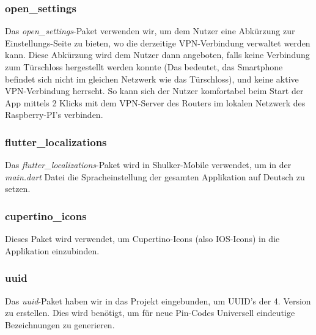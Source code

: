 \subsubsection{open\_settings}
Das \textit{open\_settings}-Paket verwenden wir, um dem Nutzer eine Abkürzung zur Einstellungs-Seite zu bieten, 
wo die derzeitige VPN-Verbindung verwaltet werden kann. Diese Abkürzung wird dem Nutzer dann angeboten, falls 
keine Verbindung zum Türschloss hergestellt werden konnte (Das bedeutet, das Smartphone befindet sich nicht im gleichen
Netzwerk wie das Türschloss), und keine aktive VPN-Verbindung herrscht. So kann sich der Nutzer komfortabel beim Start
der App mittels 2 Klicks mit dem VPN-Server des Routers im lokalen Netzwerk des Raspberry-PI's verbinden. 

\subsubsection{flutter\_localizations}
Das \textit{flutter\_localizations}-Paket wird in Shulker-Mobile verwendet, um in der \textit{main.dart} Datei
die Spracheinstellung der gesamten Applikation auf Deutsch zu setzen.

\subsubsection{cupertino\_icons}
Dieses Paket wird verwendet, um Cupertino-Icons (also IOS-Icons) in die Applikation einzubinden.

\subsubsection{uuid}
Das \textit{uuid}-Paket haben wir in das Projekt eingebunden, um UUID's der 4. Version zu erstellen.
Dies wird benötigt, um für neue Pin-Codes Universell eindeutige Bezeichnungen zu generieren.